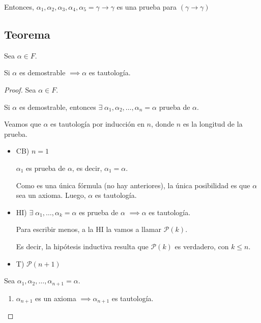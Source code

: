 Entonces, $\alpha_1, \alpha_2, \alpha_3, \alpha_4, \alpha_5=\gamma \to \gamma$
es una prueba para $(\gamma \to \gamma)$

\subsection{Teorema}


\begin{teorema}{}{}
    Sea $\alpha \in F$.

    \medskip

    Si $\alpha$ es demostrable $\implies \alpha$ es tautología.
\end{teorema}

\begin{proof} \phantom{.}
    
    Sea $\alpha \in F$.

    Si $\alpha$ es demostrable, entonces $\exists \; \alpha_1,
    \alpha_2, \dotsc, \alpha_n=\alpha$ prueba de $\alpha$.

    Veamos que $\alpha$ es tautología por inducción en $n$, donde $n$ es la 
    longitud de la prueba.

    \begin{itemize}
        \item CB) $n=1$

            $\alpha_1$ es prueba de $\alpha$, es decir, $\alpha_1=\alpha$.

            Como es una única fórmula (no hay anteriores), la única 
            posibilidad es que $\alpha$ sea un axioma. Luego, $\alpha$ es
            tautología.

        \item HI) $\exists \; \alpha_1, \dotsc, \alpha_k = \alpha$ es prueba 
            de $\alpha$ $\implies \alpha$ es tautología.

            Para escribir menos, a la HI la vamos a llamar $\mathcal{P}(k)$.

            Es decir, la hipótesis inductiva resulta que $\mathcal{P}(k)$ es
            verdadero, con $k \leq n$.

        \item T) $\mathcal{P}(n+1)$
    \end{itemize}
    

    Sea $\alpha_1, \alpha_2, \dotsc, \alpha_{n+1} = \alpha$.

    \begin{enumerate}[%
                    labelindent=*,
                    style=multiline,
                    leftmargin=*,
                    align=left,
                    leftmargin=2\parindent,
                    label=Caso \arabic*)]
        \item $\alpha_{n+1}$ es un axioma $\implies \alpha_{n+1}$  es 
            tautología.


\end{enumerate}
\end{proof}
